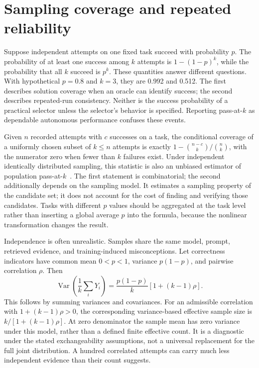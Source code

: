 \section{Sampling coverage and repeated reliability}
\label{sec:C09:sampling}
Suppose independent attempts on one fixed task succeed with probability $p$. The probability of at least one success among $k$ attempts is $1-(1-p)^k$, while the probability that all $k$ succeed is $p^k$. These quantities answer different questions. With hypothetical $p=0.8$ and $k=3$, they are 0.992 and 0.512. The first describes solution coverage when an oracle can identify success; the second describes repeated-run consistency. Neither is the success probability of a practical selector unless the selector's behavior is specified. Reporting pass-at-$k$ as dependable autonomous performance confuses these events.

Given $n$ recorded attempts with $c$ successes on a task, the conditional coverage of a uniformly chosen subset of $k\leq n$ attempts is exactly $1-\binom{n-c}{k}/\binom nk$, with the numerator zero when fewer than $k$ failures exist. Under independent identically distributed sampling, this statistic is also an unbiased estimator of population pass-at-$k$~\cite{chen2021codeeval}. The first statement is combinatorial; the second additionally depends on the sampling model. It estimates a sampling property of the candidate set; it does not account for the cost of finding and verifying those candidates. Tasks with different $p$ values should be aggregated at the task level rather than inserting a global average $p$ into the formula, because the nonlinear transformation changes the result.

Independence is often unrealistic. Samples share the same model, prompt, retrieved evidence, and training-induced misconceptions. Let correctness indicators have common mean $0<p<1$, variance $p(1-p)$, and pairwise correlation $\rho$. Then
\begin{equation}
 \operatorname{Var}\!\left(\frac1k\sum_iY_i\right)
 =\frac{p(1-p)}k[1+(k-1)\rho].
\end{equation}
This follows by summing variances and covariances. For an admissible correlation with $1+(k-1)\rho>0$, the corresponding variance-based effective sample size is $k/[1+(k-1)\rho]$. At zero denominator the sample mean has zero variance under this model, rather than a defined finite effective count. It is a diagnostic under the stated exchangeability assumptions, not a universal replacement for the full joint distribution. A hundred correlated attempts can carry much less independent evidence than their count suggests.

